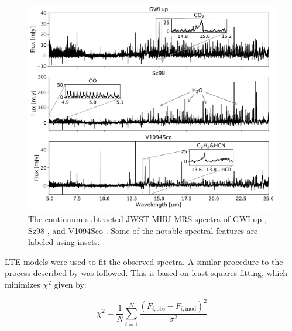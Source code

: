 \documentclass[oneside, single, authoryear, semicolon, 12pt]{lion-msc}
\newcommand{\4}{$_4$}
\newcommand{\3}{$_3$}
\newcommand{\2}{$_2$}
\begin{document}
\begin{figure}[H]
    \centering
    \includegraphics[width=\linewidth]{Figures/Measurements.pdf}
    \caption{The continuum subtracted JWST MIRI MRS spectra of GWLup \citep{Gasman_2023}, Sz98 \citep{Grant_2023}, and V1094Sco \citep{taboneinprepp}. Some of the notable spectral features are labeled using insets.}
    \label{fig: Measurements}
\end{figure}

LTE models were used to fit the observed spectra. A similar procedure to the process described by \cite{Grant_2023} was followed. This is based on least-squares fitting, which minimizes $\chi^2$ given by:

\begin{equation}
    \chi^2=\frac{1}{N}\sum_{i=1}^N\frac{(F_{i,\mathrm{obs}}-F_{i, \mathrm{mod}})^2}{\sigma^2}
    \label{eq: chi-square}
\end{equation}
\end{document}
